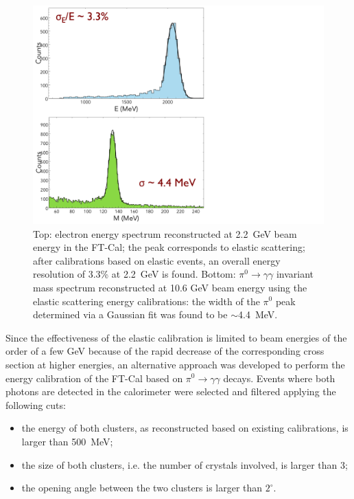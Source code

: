 \begin{figure}[t]
\centering
\includegraphics[height=1.0\columnwidth]{fig/ftcal_elasticres.pdf}
\caption{Top: electron energy spectrum reconstructed at 2.2~GeV beam energy in the FT-Cal; the peak corresponds
  to elastic scattering; after calibrations based on elastic events, an overall energy resolution of 3.3\% at 2.2~GeV is
  found. Bottom: $\pi^0\to\gamma\gamma$ invariant mass spectrum reconstructed at 10.6 GeV beam energy using the
  elastic scattering energy calibrations: the width of the $\pi^0$ peak determined via a Gaussian fit was found to be
  $\sim$4.4~MeV.}
\label{fig:ftcal_elasticres}
\end{figure}

Since the effectiveness of the elastic calibration is limited to beam energies of the order of a few GeV because of
the rapid decrease of the corresponding cross section at higher energies, an alternative approach was developed to
perform the energy calibration of the FT-Cal based on $\pi^0\to\gamma\gamma$ decays. Events where both
photons are detected in the calorimeter were selected and filtered applying the following cuts:
\begin{itemize}
    \item the energy of both clusters, as reconstructed based on existing calibrations, is larger than 500~MeV;
    \item the size of both clusters, i.e. the number of crystals involved, is larger than 3;
    \item the opening angle between the two clusters is larger than $2^\circ$.
\end{itemize}

